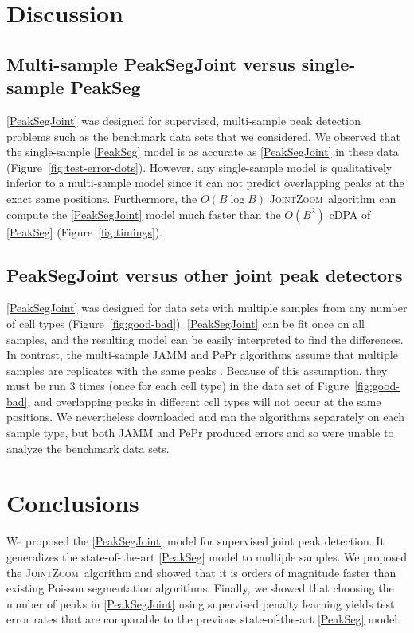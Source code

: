 \documentclass{article} %
\newcommand{\JointHeuristic}{\textsc{JointZoom}}
\begin{document}
\section{Discussion}
\label{sec:discussion}

\subsection{Multi-sample PeakSegJoint versus single-sample PeakSeg}

\ref{PeakSegJoint} was designed for supervised, multi-sample peak
detection problems such as the benchmark data sets that we
considered. We observed that the single-sample \ref{PeakSeg} model is
as accurate as \ref{PeakSegJoint} in these data
(Figure~\ref{fig:test-error-dots}). However, any single-sample model
is qualitatively inferior to a multi-sample model since it can not
predict overlapping peaks at the exact same positions. Furthermore,
the $O(B \log B)$ \JointHeuristic\ algorithm can compute the
\ref{PeakSegJoint} model much faster than the $O(B^2)$ cDPA of
\ref{PeakSeg} (Figure~\ref{fig:timings}).

\subsection{PeakSegJoint versus other joint peak detectors}

\ref{PeakSegJoint} was designed for data sets with
multiple samples from any number of cell types
(Figure~\ref{fig:good-bad}). \ref{PeakSegJoint} can be fit once on all
samples, and the resulting model can be easily interpreted to find the
differences. In contrast, the multi-sample JAMM and PePr algorithms
assume that multiple samples are replicates with the same peaks
\citep{JAMM, PePr}. Because of this assumption, they must be run 3
times (once for each cell type) in the data set of
Figure~\ref{fig:good-bad}, and overlapping peaks in different cell
types will not occur at the same positions. We nevertheless downloaded
and ran the algorithms separately on each sample type, but both JAMM
and PePr produced errors and so were unable to analyze the benchmark
data sets. 

\section{Conclusions}
\label{sec:conclusions}

We proposed the \ref{PeakSegJoint} model for supervised joint peak
detection. It generalizes the state-of-the-art \ref{PeakSeg} model to
multiple samples. We proposed the \JointHeuristic\ algorithm and
showed that it is orders of magnitude faster than existing Poisson
segmentation algorithms. Finally, we showed that choosing the number
of peaks in \ref{PeakSegJoint} using supervised penalty learning
yields test error rates that are comparable to the previous
state-of-the-art \ref{PeakSeg} model.
\end{document}
